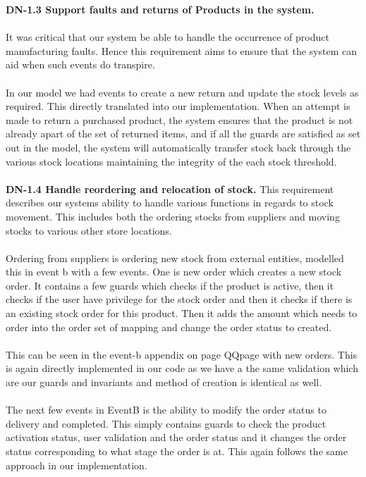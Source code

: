 \documentclass[a4paper]{article}
\begin{document}
\textbf{DN-1.3 Support faults and returns of Products in the system.}
\\\\
It was critical that our system be able to handle the occurrence of product manufacturing faults. Hence this requirement aims to ensure that the system can aid when such events do transpire.
\\\\
In our model we had events to create a new return and update the stock levels as required. This directly translated into our implementation. When an attempt is made to return a purchased product, the system ensures that the product is not already apart of the set of returned items, and if all the guards are satisfied as set out in the model, the system will automatically transfer stock back through the various stock locations maintaining the integrity of the each stock threshold.
\\\\
\textbf{DN-1.4 Handle reordering and relocation of stock.}
This requirement describes our systems ability to handle various functions in regards to stock movement. This includes both the ordering stocks from suppliers and moving stocks to various other store locations. 
\\\\
Ordering from suppliers is ordering new stock from external entities, modelled this in event b with a few events. One is new order which creates a new stock order. It contains a few guards which checks if the product is active, then it checks if the user have privilege for the stock order and then it checks if there is an existing stock order for this product. Then it adds the amount which needs to order into the order set of mapping and change the order status to created. 
\\\\
This can be seen in the event-b appendix on page QQpage with new orders. This is again directly implemented in our code as we have a the same validation which are our guards and invariants and method of creation is identical as well. 
\\\\
The next few events in EventB is the ability to modify the order status to delivery and completed. This simply contains guards to check the product activation status, user validation and the order status and it changes the order status corresponding to what stage the order is at. This again follows the same approach in our implementation. 
\\\\
\end{document}
